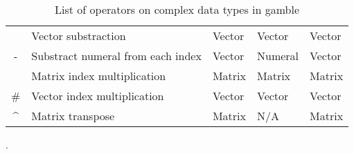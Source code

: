 \begin{table}[ht]
\begin{tabular}{|c|l|l|l|l|}
                    & \cellcolor{gray!40}Vector substraction    & \cellcolor{gray!40}Vector        & \cellcolor{gray!40}Vector         & \cellcolor{gray!40}Vector       \\ \cline{2-5}
\multirow{-4}{*}{-} & Substract numeral from each index         & Vector                           & Numeral                           & Vector                          \\ \hline
                    & \cellcolor{gray!40}Matrix index multiplication & \cellcolor{gray!40}Matrix    & \cellcolor{gray!40}Matrix         & \cellcolor{gray!40}Matrix \\ \cline{2-5}
\multirow{-2}{*}{\#}& Vector index multiplication               & Vector                            & Vector                            & Vector \\ \hline
\^{}                 & \cellcolor{gray!40}Matrix transpose      & \cellcolor{gray!40}Matrix         & \cellcolor{gray!40}N/A            & \cellcolor{gray!40}Matrix \\ \hline

\end{tabular}
\caption{List of operators on complex data types in \gls{gamble}}. \label{tbl:matOps}
\end{table} 
